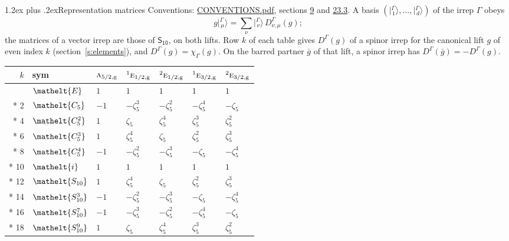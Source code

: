 \documentclass[10pt,a4paper]{article}
\makeatletter
\renewcommand\section{\@startsection{section}{1}{\z@}{-3ex plus -1ex minus -.2ex}%
  {1.2ex plus .2ex}{\normalfont\large\sffamily\bfseries\color{parttitle}}}
\numberwithin{equation}{section}
\newcommand{\eltfont}[1]{{\let\sigma\eltsigma\mathelt{#1}}}
\newcommand{\grp}[1]{\mathsf{#1}}
\newcommand{\irr}[1]{\text{\normalfont\scshape #1}}
\newcommand{\conjpair}[1]{{}^{#1}}
\newcommand{\cls}[1]{\eltfont{#1}}
\newcommand{\ptag}[1]{\mathrm{#1}}
\newcommand{\rootunity}[1]{\zeta_{#1}}
\newcommand{\repD}[1]{D^{#1}}
\newcommand{\irchar}[1]{\chi_{#1}}
\newcommand{\intx}{\mu}
\newcommand{\irket}[2]{\bigl\lvert{}^{#1}_{\,#2}\bigr\rangle}
\newcommand{\barred}[1]{\bar{#1}}
\makeatother
\begin{document}
\section{Representation matrices}\label{s:irrep_matrices}
Conventions: \href{../../CONVENTIONS.pdf}{CONVENTIONS.pdf}, sections \href{../../../rotation/CONVENTIONS.pdf\#conv.9}{9} and \href{../../CONVENTIONS.pdf\#conv.23.3}{23.3}.
\leavevmode\label{n:vector.ket.partner}\label{n:index.partner}\label{n:matrix.irrep}A basis $(\irket{\Gamma}{1}, \dots, \irket{\Gamma}{d})$ of the irrep $\Gamma$ obeys
\begin{equation}\label{e:partner}g\irket{\Gamma}{\intx} = \sum_\nu \irket{\Gamma}{\nu}\, \repD{\Gamma}_{\nu,\intx}(g);\end{equation}
the matrices of a vector irrep are those of \href{../../../rotation/data/pdf/S10.pdf}{$\grp{S_{10}}$}, on both lifts. Row $k$ of each table gives $\repD{\Gamma}(g)$ of a spinor irrep for the canonical lift $g$ of even index $k$ (section~\ref{s:elements}), and $\repD{\Gamma}(g) = \irchar{\Gamma}(g)$. On the barred partner $\barred{g}$ of that lift, a spinor irrep has $\repD{\Gamma}(\barred{g}) = -\repD{\Gamma}(g)$.
{\small\setlength{\tabcolsep}{4pt}
\begin{longtable}{@{}rllllll@{}}\toprule
$k$ & sym & $\irr{a}_{5/2,\ptag{g}}$ & $\conjpair{1}\irr{e}_{1/2,\ptag{g}}$ & $\conjpair{2}\irr{e}_{1/2,\ptag{g}}$ & $\conjpair{1}\irr{e}_{3/2,\ptag{g}}$ & $\conjpair{2}\irr{e}_{3/2,\ptag{g}}$\\\midrule\endhead
\bottomrule\endfoot\endlastfoot
0 & $\cls{E}$ & $1$ & $1$ & $1$ & $1$ & $1$\\*
2 & $\cls{C_{5}}$ & $-1$ & $-\rootunity{5}^{3}$ & $-\rootunity{5}^{2}$ & $-\rootunity{5}^{4}$ & $-\rootunity{5}$\\*
4 & $\cls{C_{5}^{2}}$ & $1$ & $\rootunity{5}$ & $\rootunity{5}^{4}$ & $\rootunity{5}^{3}$ & $\rootunity{5}^{2}$\\*
6 & $\cls{C_{5}^{3}}$ & $1$ & $\rootunity{5}^{4}$ & $\rootunity{5}$ & $\rootunity{5}^{2}$ & $\rootunity{5}^{3}$\\*
8 & $\cls{C_{5}^{4}}$ & $-1$ & $-\rootunity{5}^{2}$ & $-\rootunity{5}^{3}$ & $-\rootunity{5}$ & $-\rootunity{5}^{4}$\\*
10 & $\cls{i}$ & $1$ & $1$ & $1$ & $1$ & $1$\\*
12 & $\cls{S_{10}}$ & $1$ & $\rootunity{5}^{4}$ & $\rootunity{5}$ & $\rootunity{5}^{2}$ & $\rootunity{5}^{3}$\\*
14 & $\cls{S_{10}^{3}}$ & $-1$ & $-\rootunity{5}^{2}$ & $-\rootunity{5}^{3}$ & $-\rootunity{5}$ & $-\rootunity{5}^{4}$\\*
16 & $\cls{S_{10}^{7}}$ & $-1$ & $-\rootunity{5}^{3}$ & $-\rootunity{5}^{2}$ & $-\rootunity{5}^{4}$ & $-\rootunity{5}$\\*
18 & $\cls{S_{10}^{9}}$ & $1$ & $\rootunity{5}$ & $\rootunity{5}^{4}$ & $\rootunity{5}^{3}$ & $\rootunity{5}^{2}$\\
\bottomrule\end{longtable}}
\end{document}
